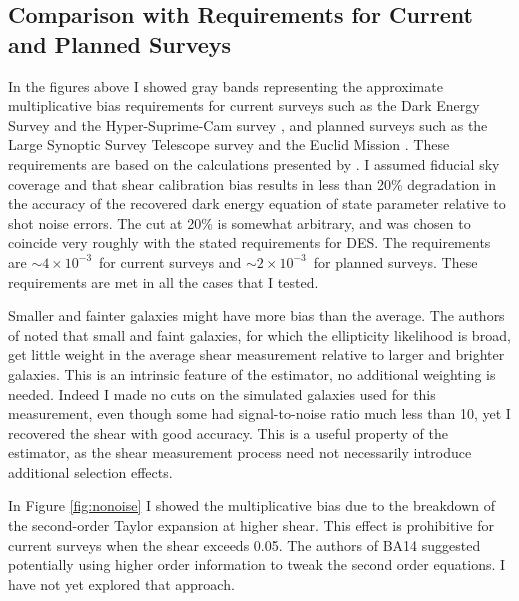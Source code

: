 \documentclass[usegraphicx,usenatbib]{mn2e}
\newcommand{\desreq}{$4\times 10^{-3}$}
\newcommand{\lsstreq}{$2\times 10^{-3}$}
\begin{document}
\subsection{Comparison with Requirements for Current and Planned Surveys}
\label{sec:req}

In the figures above I showed gray bands representing the approximate
multiplicative bias requirements for current surveys such as the Dark Energy
Survey \citep[][DES]{DESWhitePaper} and the Hyper-Suprime-Cam survey
\citep[][HSC]{HSC12}, and planned surveys such as the Large Synoptic Survey
Telescope survey \citep[][LSST]{IvezicLSST08} and the Euclid Mission
\citep{Euclid2011}.  These requirements are based on the calculations presented
by \citet{HutererSystematics06}. I assumed fiducial sky coverage and that shear
calibration bias results in less than 20\% degradation in the accuracy of the
recovered dark energy equation of state parameter relative to shot noise
errors.  The cut at 20\% is somewhat arbitrary, and was chosen to coincide very
roughly with the stated requirements for DES. The requirements are
$\sim$\desreq\ for current surveys and $\sim$\lsstreq\ for planned surveys.
These requirements are met in all the cases that I tested.

Smaller and fainter galaxies might have more bias than the average.  The
authors of \cite{ba14} noted that small and faint galaxies, for which the
ellipticity likelihood is broad, get little weight in the average shear
measurement relative to larger and brighter galaxies.  This is an intrinsic
feature of the estimator, no additional weighting is needed.  Indeed I made no
cuts on the simulated galaxies used for this measurement, even though some had
signal-to-noise ratio much less than 10, yet I recovered the shear with good
accuracy.  This is a useful property of the estimator, as the shear measurement
process need not necessarily introduce additional selection effects.

In Figure \ref{fig:nonoise} I showed the multiplicative bias due to the
breakdown of the second-order Taylor expansion at higher shear.   This effect
is prohibitive for current surveys when the shear exceeds 0.05.  The authors of
BA14 suggested potentially using higher order information to tweak the second
order equations.  I have not yet explored that approach.

\end{document}
